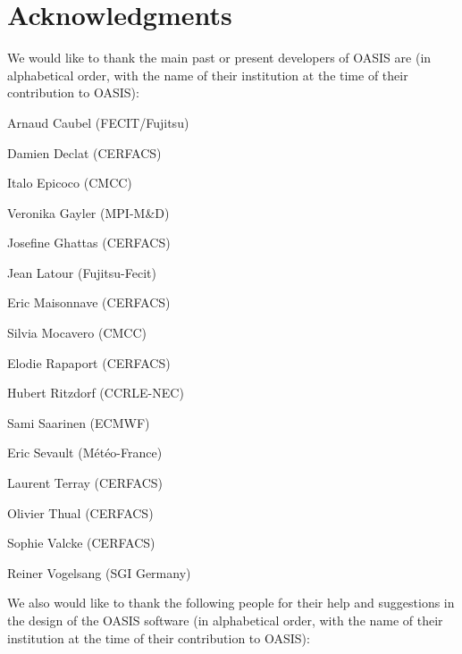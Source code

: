 \newpage


\chapter{Acknowledgments}

We would like to thank the main past or present developers of OASIS
are (in alphabetical order, with the name of their institution at the time of their contribution to OASIS):
\begin{description}
  \item Arnaud Caubel (FECIT/Fujitsu)
  \item Damien Declat (CERFACS)
  \item Italo Epicoco (CMCC)
  \item Veronika Gayler (MPI-M\&D)
  \item Josefine Ghattas (CERFACS)
  \item Jean Latour (Fujitsu-Fecit)
  \item Eric Maisonnave (CERFACS)
  \item Silvia Mocavero (CMCC)
  \item Elodie Rapaport (CERFACS)
  \item Hubert Ritzdorf (CCRLE-NEC)
  \item Sami Saarinen (ECMWF)
  \item Eric Sevault (M\'et\'eo-France)
  \item Laurent Terray (CERFACS)
  \item Olivier Thual (CERFACS)
  \item Sophie Valcke (CERFACS)
  \item Reiner Vogelsang (SGI Germany)
\end{description}

We also would like to thank the following people for their help
and suggestions in the design of the OASIS software (in alphabetical
order, with the name of their institution at the time of their contribution to OASIS):

